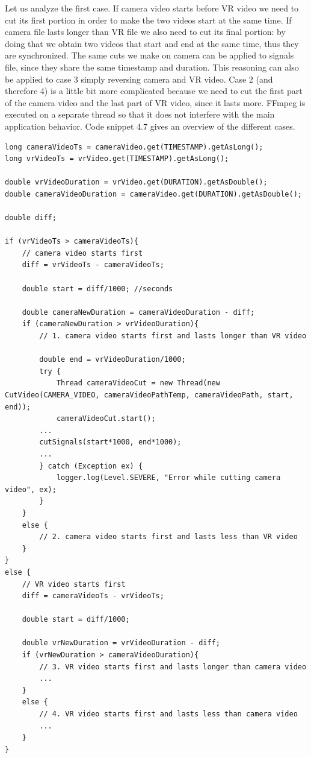 \documentclass[binding=0.6cm,LaM]{sapthesis}
\begin{document}
Let us analyze the first case. If camera video starts before VR video we need to cut its first portion in order to make the two videos start at the same time. If camera file lasts longer than VR file we also need to cut its final portion: by doing that we obtain two videos that start and end at the same time, thus they are synchronized. The same cuts we make on camera can be applied to signals file, since they share the same timestamp and duration. This reasoning can also be applied to case 3 simply reversing camera and VR video. 
Case 2 (and therefore 4) is a little bit more complicated because we need to cut the first part of the camera video and the last part of VR video, since it lasts more.  
FFmpeg is executed on a separate thread so that it does not interfere with the main application behavior. Code snippet 4.7 gives an overview of the different cases.
\\
\begin{lstlisting}[caption={Cut video cases}, captionpos=b]
long cameraVideoTs = cameraVideo.get(TIMESTAMP).getAsLong();
long vrVideoTs = vrVideo.get(TIMESTAMP).getAsLong();
        
double vrVideoDuration = vrVideo.get(DURATION).getAsDouble();
double cameraVideoDuration = cameraVideo.get(DURATION).getAsDouble();

double diff;
        
if (vrVideoTs > cameraVideoTs){
	// camera video starts first
	diff = vrVideoTs - cameraVideoTs;
            
	double start = diff/1000; //seconds

	double cameraNewDuration = cameraVideoDuration - diff;
	if (cameraNewDuration > vrVideoDuration){ 
    	// 1. camera video starts first and lasts longer than VR video
               
		double end = vrVideoDuration/1000;
		try {
			Thread cameraVideoCut = new Thread(new CutVideo(CAMERA_VIDEO, cameraVideoPathTemp, cameraVideoPath, start, end));
			cameraVideoCut.start();
        ...
        cutSignals(start*1000, end*1000);
        ...
        } catch (Exception ex) {
			logger.log(Level.SEVERE, "Error while cutting camera video", ex);
		}
	}
	else {
		// 2. camera video starts first and lasts less than VR video
	}
}
else {
	// VR video starts first
	diff = cameraVideoTs - vrVideoTs;
            
	double start = diff/1000;

	double vrNewDuration = vrVideoDuration - diff;
	if (vrNewDuration > cameraVideoDuration){ 
		// 3. VR video starts first and lasts longer than camera video
		...
	}
	else {
		// 4. VR video starts first and lasts less than camera video
		...
	}
} 
\end{lstlisting}
\end{document}
